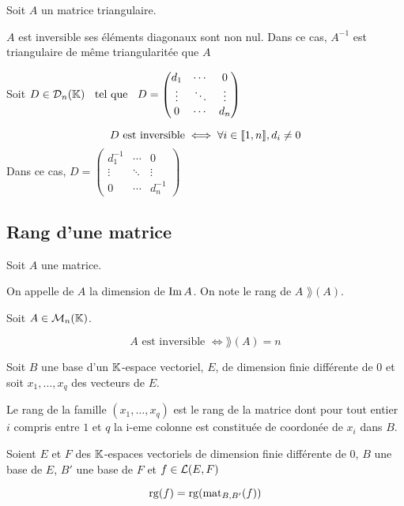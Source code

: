 \begin{prp}
Soit $A$ un matrice triangulaire.

$A$ est inversible \ssi ses éléments diagonaux sont non nul.
Dans ce cas, $A^{-1}$ est triangulaire de même triangularitée que $A$
\end{prp}

\begin{prp}
Soit $D \in \operatorname{\mathcal{D}}_n(\mathbb{K}) \;\;\text{ tel que }\;\; D =
    \begin{pmatrix}
        d_1 & \cdots & 0 \\
        \vdots & \ddots & \vdots \\
        0 & \cdots & d_n
    \end{pmatrix}
$

\[
    D \text{ est inversible} \iff \forall i \in \llbracket 1, n \rrbracket, d_i \neq 0
\]
Dans ce cas, $D =
    \begin{pmatrix}
        d_1^{-1} & \cdots & 0 \\
        \vdots & \ddots & \vdots \\
        0 & \cdots & d_n^{-1}
    \end{pmatrix}
$
\end{prp}


\subsection{Rang d'une matrice}

\begin{dfn}
Soit $A$ une matrice.

On appelle  de $A$ la dimension de $\operatorname{Im}{A}$.
On note le rang de $A$ $\rang(A)$.
\end{dfn}

\begin{prp}
Soit $A \in \operatorname{\mathcal{M}}_n(\mathbb{K})$.

\[
    A \text{ est inversible } \iff \rang(A) = n
\]
\end{prp}

\begin{prp}
Soit $B$ une base d'un $\mathbb{K}$-espace vectoriel, $E$, de dimension finie
différente de $0$ et soit $x_1, \ldots, x_q$ des vecteurs de $E$.

Le rang de la famille $(x_1, \ldots, x_q)$ est le rang de la matrice
dont pour tout entier $i$ compris entre $1$ et $q$ la i-eme colonne
est constituée de coordonée de $x_i$ dans $B$.
\end{prp}

\begin{prp}
Soient $E$ et $F$ des $\mathbb{K}$-espaces vectoriels de dimension finie différente
de $0$, $B$ une base de $E$, $B'$ une base de $F$ et $f \in \operatorname{\mathcal{L}}(E, F)$

\[
    \operatorname{rg}(f) = \operatorname{rg}(\operatorname{mat}_{B, B'}(f))
\]
\end{prp}



